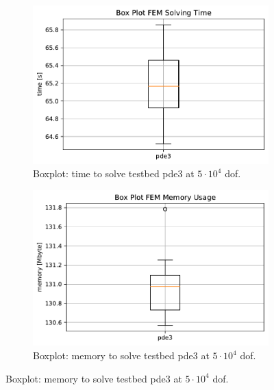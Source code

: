 \documentclass[./\jobname.tex]{subfiles}
\begin{document}
\begin{figure}[h]
	\centering
	\begin{subfigure}[b]{0.5\linewidth}
		\centering
		\includegraphics[width=1\textwidth]{../../code/experiments/_experiment_fem_base/time_boxplot_pde_3.pdf}
		\caption{Boxplot: time to solve testbed \gls{pde}3 at $5\cdot 10^4$ \gls{dof}.}
		\label{fig:_fem_time_boxplot_pde3}
	\end{subfigure}%
	\begin{subfigure}[b]{0.5\linewidth}
		\centering
		\includegraphics[width=1\textwidth]{../../code/experiments/_experiment_fem_base/mem_boxplot_pde_3.pdf}
		\caption{Boxplot: memory to solve testbed \gls{pde}3 at $5\cdot 10^4$ \gls{dof}.}
		\label{fig:_fem_mem_boxplot_pde3}
	\end{subfigure}%
	\label{}
\end{figure}
\end{document}
